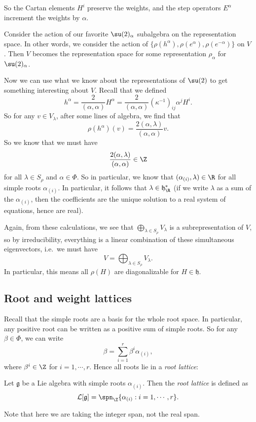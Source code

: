 \documentclass[a4paper]{article}
\begin{document}
So the Cartan elements $H^i$ preserve the weights, and the step operators $E^\alpha$ increment the weights by $\alpha$.

Consider the action of our favorite $\su(2)_\alpha$ subalgebra on the representation space. In other words, we consider the action of $\{\rho(h^\alpha), \rho(e^\alpha), \rho(e^{-\alpha})\}$ on $V$. Then $V$ becomes the representation space for some representation $\rho_\alpha$ for $\su(2)_\alpha$.

Now we can use what we know about the representations of $\su(2)$ to get something interesting about $V$. Recall that we defined
\[
  h^\alpha = \frac{2}{(\alpha, \alpha)} H^\alpha = \frac{2}{(\alpha, \alpha)} (\kappa^{-1})_{ij} \alpha^j H^i.
\]
So for any $v \in V_\lambda$, after some lines of algebra, we find that
\[
  \rho(h^\alpha)(v) = \frac{2(\alpha, \lambda)}{(\alpha, \alpha)} v.
\]
So we know that we must have
\[
  \frac{2(\alpha, \lambda)}{(\alpha, \alpha)} \in \Z
\]
for all $\lambda \in S_\rho$ and $\alpha \in \Phi$. So in particular, we know that $(\alpha_{(i)}, \lambda) \in \R$ for all simple roots $\alpha_{(i)}$. In particular, it follows that $\lambda \in \mathfrak{h}^*_\R$ (if we write $\lambda$ as a sum of the $\alpha_{(i)}$, then the coefficients are the unique solution to a real system of equations, hence are real).

Again, from these calculations, we see that $\bigoplus_{\lambda \in S_\rho} V_\lambda$ is a subrepresentation of $V$, so by irreducibility, everything is a linear combination of these simultaneous eigenvectors, i.e.\ we must have
\[
  V = \bigoplus_{\lambda \in S_\rho} V_\lambda.
\]
In particular, this means all $\rho(H)$ are diagonalizable for $H \in \mathfrak{h}$.

\subsection{Root and weight lattices}
Recall that the simple roots are a basis for the whole root space. In particular, any positive root can be written as a positive sum of simple roots. So for any $\beta \in \Phi$, we can write
\[
  \beta = \sum_{i = 1}^r \beta^i \alpha_{(i)},
\]
where $\beta^i \in \Z$ for $i = 1, \cdots, r$. Hence all roots lie in a \emph{root lattice}:
\begin{defi}
  Let $\mathfrak{g}$ be a Lie algebra with simple roots $\alpha_{(i)}$. Then the \emph{root lattice} is defined as
  \[
    \mathcal{L}[\mathfrak{g}] = \spn_\Z\{\alpha_{(i)}: i = 1, \cdots, r\}.
  \]
\end{defi}
Note that here we are taking the integer span, not the real span.
\end{document}
